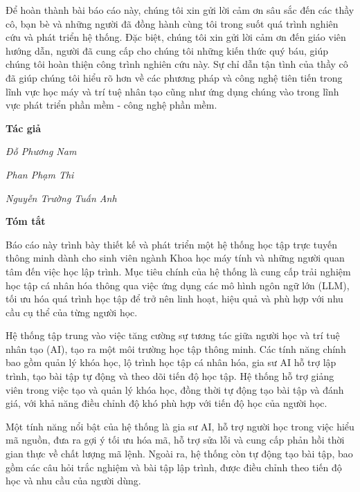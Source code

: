 \documentclass[12pt,a4paper]{report}
\theoremstyle{definition}
\begin{document}
\par Để hoàn thành bài báo cáo này, chúng tôi xin gửi lời cảm ơn sâu sắc đến các thầy cô, bạn bè và những người đã đồng hành cùng tôi trong suốt quá trình nghiên cứu và phát triển hệ thống. Đặc biệt, chúng tôi xin gửi lời cảm ơn đến giáo viên hướng dẫn, người đã cung cấp cho chúng tôi những kiến thức quý báu, giúp chúng tôi hoàn thiện công trình nghiên cứu này. Sự chỉ dẫn tận tình của thầy cô đã giúp chúng tôi hiểu rõ hơn về các phương pháp và công nghệ tiên tiến trong lĩnh vực học máy và trí tuệ nhân tạo cũng như ứng dụng chúng vào trong lĩnh vực phát triển phần mềm - công nghệ phần mềm.

\par\hfill\textbf{Tác giả}\hspace{1cm}
\par\hfill\textit{Đỗ Phương Nam}
\par\hfill\textit{Phan Phạm Thi}\hspace{0.3cm}
\par\hfill\textit{Nguyễn Trường Tuấn Anh}\hspace{0.2cm}
\newpage

\begin{center}
    \textbf{\Large Tóm tắt}
\end{center}

\par Báo cáo này trình bày thiết kế và phát triển một hệ thống học tập trực tuyến thông minh dành cho sinh viên ngành Khoa học máy tính và những người quan tâm đến việc học lập trình. Mục tiêu chính của hệ thống là cung cấp trải nghiệm học tập cá nhân hóa thông qua việc ứng dụng các mô hình ngôn ngữ lớn (LLM), tối ưu hóa quá trình học tập để trở nên linh hoạt, hiệu quả và phù hợp với nhu cầu cụ thể của từng người học.

\par Hệ thống tập trung vào việc tăng cường sự tương tác giữa người học và trí tuệ nhân tạo (AI), tạo ra một môi trường học tập thông minh. Các tính năng chính bao gồm quản lý khóa học, lộ trình học tập cá nhân hóa, gia sư AI hỗ trợ lập trình, tạo bài tập tự động và theo dõi tiến độ học tập. Hệ thống hỗ trợ giảng viên trong việc tạo và quản lý khóa học, đồng thời tự động tạo bài tập và đánh giá, với khả năng điều chỉnh độ khó phù hợp với tiến độ học của người học.

\par Một tính năng nổi bật của hệ thống là gia sư AI, hỗ trợ người học trong việc hiểu mã nguồn, đưa ra gợi ý tối ưu hóa mã, hỗ trợ sửa lỗi và cung cấp phản hồi thời gian thực về chất lượng mã lệnh. Ngoài ra, hệ thống còn tự động tạo bài tập, bao gồm các câu hỏi trắc nghiệm và bài tập lập trình, được điều chỉnh theo tiến độ học và nhu cầu của người dùng.
\end{document}
